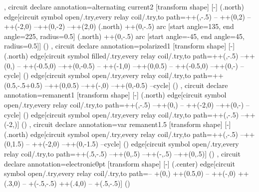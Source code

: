 {{  },
  circuit declare annotation={alternating current}{2\tikzcircuitssizeunit}
  {
    [transform shape]
    [-]
    (\tikzlastnode.north) edge[circuit symbol open/.try,every relay coil/.try,to path={++(\tikzcircuitssizeunit,-.5\pgflinewidth) -- ++(0,2\tikzcircuitssizeunit) --++(-2\tikzcircuitssizeunit,0) --++(0,-2\tikzcircuitssizeunit) --++(2\tikzcircuitssizeunit,0)
    (\tikzlastnode.north) ++(0,\tikzcircuitssizeunit-.5\pgflinewidth) arc [start angle=135, end angle=225, radius=0.5\tikzcircuitssizeunit]
    (\tikzlastnode.north) ++(0,\tikzcircuitssizeunit-.5\pgflinewidth) arc [start angle=-45, end angle=45, radius=0.5\tikzcircuitssizeunit]}] () 
  },
  circuit declare annotation={polarized}{1\tikzcircuitssizeunit}
  {
    [transform shape]
    [-]
    (\tikzlastnode.north) edge[circuit symbol filled/.try,every relay coil/.try,to path={++(\tikzcircuitssizeunit,-.5\pgflinewidth) --++(0,\tikzcircuitssizeunit) -- ++(-0.5\tikzcircuitssizeunit,0) --++(0,-0.5\tikzcircuitssizeunit) -- ++(-1\tikzcircuitssizeunit,0) --++(0,0.5\tikzcircuitssizeunit) -- ++(-0.5\tikzcircuitssizeunit,0)  --++(0,-\tikzcircuitssizeunit) --cycle}] () edge[circuit symbol open/.try,every relay coil/.try,to path={++(0.5\tikzcircuitssizeunit,-.5\pgflinewidth+0.5\tikzcircuitssizeunit) --++(0,0.5\tikzcircuitssizeunit) --++(-\tikzcircuitssizeunit,0) --++(0,-0.5\tikzcircuitssizeunit) --cycle}] ()
  },
  circuit declare annotation={remanent}{1\tikzcircuitssizeunit}
  {
    [transform shape]
    [-]
    (\tikzlastnode.north) edge[circuit symbol open/.try,every relay coil/.try,to path={++(\tikzcircuitssizeunit,-.5\pgflinewidth) --++(0,\tikzcircuitssizeunit) -- ++(-2\tikzcircuitssizeunit,0) --++(0,-\tikzcircuitssizeunit) --cycle}] () edge[circuit symbol open/.try,every relay coil/.try,to path={++(\tikzcircuitssizeunit,-.5\pgflinewidth) --++(-2\tikzcircuitssizeunit,\tikzcircuitssizeunit)}] ()
  },
  circuit declare annotation={var remanent}{1.5\tikzcircuitssizeunit}
  {
    [transform shape]
    [-]
    (\tikzlastnode.north) edge[circuit symbol open/.try,every relay coil/.try,to path={++(\tikzcircuitssizeunit,-.5\pgflinewidth) --++(0,1.5\tikzcircuitssizeunit) -- ++(-2\tikzcircuitssizeunit,0) --++(0,-1.5\tikzcircuitssizeunit) --cycle}] () edge[circuit symbol open/.try,every relay coil/.try,to path={++(.5\tikzcircuitssizeunit,-.5\pgflinewidth) --++(0,.5\tikzcircuitssizeunit) --++(-\tikzcircuitssizeunit,.5\tikzcircuitssizeunit) --++(0,.5\tikzcircuitssizeunit)}] ()
  },
  circuit declare annotation={electronic}{0pt}
  {
    [transform shape]
    [-]
    (\tikzlastnode.center) edge[circuit symbol open/.try,every relay coil/.try,to path={-- +(0,\tikzcircuitssizeunit) ++(0.5\tikzcircuitssizeunit,0) -- ++(-\tikzcircuitssizeunit,0) ++(.3\tikzcircuitssizeunit,0) -- +(-.5\tikzcircuitssizeunit,-.5\tikzcircuitssizeunit) ++(.4\tikzcircuitssizeunit,0) -- +(.5\tikzcircuitssizeunit,-.5\tikzcircuitssizeunit)}] ()
}}
